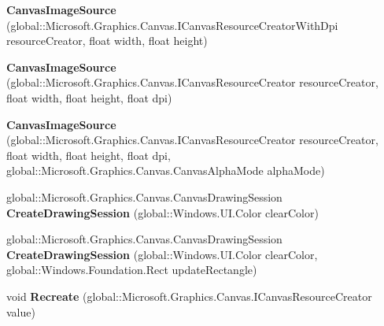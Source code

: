 \begin{DoxyCompactItemize}
{\bfseries Canvas\+Image\+Source} (global\+::\+Microsoft.\+Graphics.\+Canvas.\+I\+Canvas\+Resource\+Creator\+With\+Dpi resource\+Creator, float width, float height)
\item 
\mbox{\label{class_microsoft_1_1_graphics_1_1_canvas_1_1_u_i_1_1_xaml_1_1_canvas_image_source_a879541668a8b03ad33dddb352363a22b}} 
{\bfseries Canvas\+Image\+Source} (global\+::\+Microsoft.\+Graphics.\+Canvas.\+I\+Canvas\+Resource\+Creator resource\+Creator, float width, float height, float dpi)
\item 
\mbox{\label{class_microsoft_1_1_graphics_1_1_canvas_1_1_u_i_1_1_xaml_1_1_canvas_image_source_af7653cd38e9fa993c395e9aab7f32134}} 
{\bfseries Canvas\+Image\+Source} (global\+::\+Microsoft.\+Graphics.\+Canvas.\+I\+Canvas\+Resource\+Creator resource\+Creator, float width, float height, float dpi, global\+::\+Microsoft.\+Graphics.\+Canvas.\+Canvas\+Alpha\+Mode alpha\+Mode)
\item 
\mbox{\label{class_microsoft_1_1_graphics_1_1_canvas_1_1_u_i_1_1_xaml_1_1_canvas_image_source_a4252f5557def050fbeabcb6a457d4ec6}} 
global\+::\+Microsoft.\+Graphics.\+Canvas.\+Canvas\+Drawing\+Session {\bfseries Create\+Drawing\+Session} (global\+::\+Windows.\+U\+I.\+Color clear\+Color)
\item 
\mbox{\label{class_microsoft_1_1_graphics_1_1_canvas_1_1_u_i_1_1_xaml_1_1_canvas_image_source_ad904cc5b67ec7ea96ba67d9e7f9a7392}} 
global\+::\+Microsoft.\+Graphics.\+Canvas.\+Canvas\+Drawing\+Session {\bfseries Create\+Drawing\+Session} (global\+::\+Windows.\+U\+I.\+Color clear\+Color, global\+::\+Windows.\+Foundation.\+Rect update\+Rectangle)
\item 
\mbox{\label{class_microsoft_1_1_graphics_1_1_canvas_1_1_u_i_1_1_xaml_1_1_canvas_image_source_a0887999c04835ece8f184cdbf85b60be}} 
void {\bfseries Recreate} (global\+::\+Microsoft.\+Graphics.\+Canvas.\+I\+Canvas\+Resource\+Creator value)
\item 

\end{DoxyCompactItemize}
